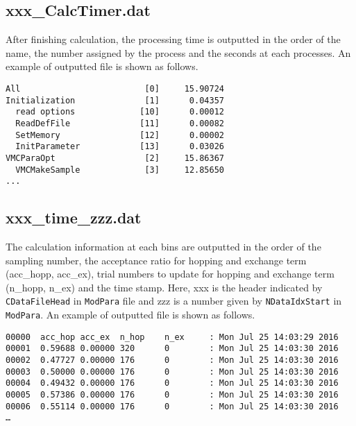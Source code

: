 \subsection{xxx\_CalcTimer.dat }
After finishing calculation, the processing time is outputted in the order of the name, the number assigned by the process and the seconds at each processes. An example of outputted file is shown as follows.

\begin{minipage}{15.5cm}
\begin{screen}
\begin{verbatim}
All                         [0]     15.90724
Initialization              [1]      0.04357
  read options             [10]      0.00012
  ReadDefFile              [11]      0.00082
  SetMemory                [12]      0.00002
  InitParameter            [13]      0.03026
VMCParaOpt                  [2]     15.86367
  VMCMakeSample             [3]     12.85650
...
\end{verbatim}
\end{screen}
\end{minipage}


\newpage
\subsection{xxx\_time\_zzz.dat }
\label{subsec:time}
The calculation information at each bins are outputted in the order of the sampling number, the acceptance ratio for hopping and exchange term (acc\_hopp, acc\_ex), trial numbers to update for hopping and exchange term (n\_hopp, n\_ex) and the time stamp.
Here, xxx is the header indicated by \verb|CDataFileHead| in \verb|ModPara| file and zzz is a number given by \verb|NDataIdxStart| in \verb|ModPara|.
An example of outputted file is shown as follows.

\begin{minipage}{15.5cm}
\begin{screen}
\begin{verbatim}
00000  acc_hop acc_ex  n_hop    n_ex     : Mon Jul 25 14:03:29 2016
00001  0.59688 0.00000 320      0        : Mon Jul 25 14:03:30 2016
00002  0.47727 0.00000 176      0        : Mon Jul 25 14:03:30 2016
00003  0.50000 0.00000 176      0        : Mon Jul 25 14:03:30 2016
00004  0.49432 0.00000 176      0        : Mon Jul 25 14:03:30 2016
00005  0.57386 0.00000 176      0        : Mon Jul 25 14:03:30 2016
00006  0.55114 0.00000 176      0        : Mon Jul 25 14:03:30 2016    
…
\end{verbatim}
\end{screen}
\end{minipage}

